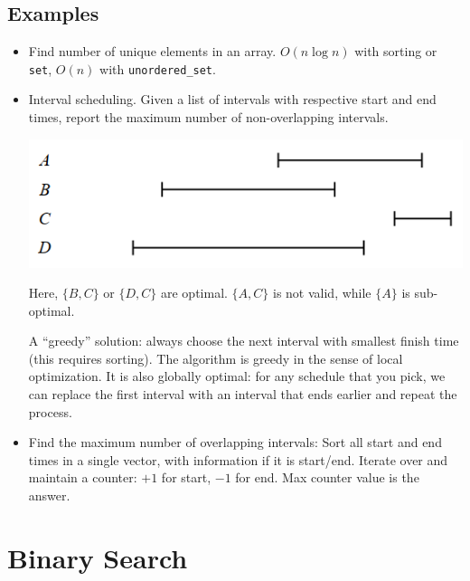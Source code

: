 \documentclass{article}
\newcommand{\T}[1]{\texttt{#1}}
\begin{document}
\begin{sloppypar}
    \subsection{Examples}
    \begin{itemize}
        \item Find number of unique elements in an array. $O(n\log n)$ with sorting or \T{set}, $O(n)$ with \T{unordered\_set}.
        \item Interval scheduling. Given a list of intervals with respective start and end times, report the maximum number of non-overlapping intervals.
        \begin{center}
            \includegraphics[width = 0.9\linewidth]{../images/interval-sched.png}
        \end{center}
        Here, $\{B,C\}$ or $\{D,C\}$ are optimal. $\{A,C\}$ is not valid, while $\{A\}$ is sub-optimal.

        \noindent A ``greedy'' solution: always choose the next interval with smallest finish time (this requires sorting). The algorithm is greedy in the sense of local optimization. It is also globally optimal: for any schedule that you pick, we can replace the first interval with an interval that ends earlier and repeat the process.

        \item Find the maximum number of overlapping intervals: Sort all start and end times in a single vector, with information if it is start/end. Iterate over and maintain a counter: $+1$ for start, $-1$ for end. Max counter value is the answer.
    \end{itemize}

    \newpage

    \section{Binary Search}

\end{sloppypar}
\end{document}
